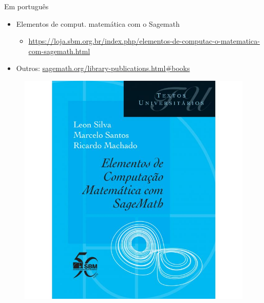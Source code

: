 \documentclass[12pt]{beamer}
\begin{document}
\begin{frame}
  {Em português}
\begin{minipage}{.5\textwidth}
  \begin{itemize}
    \item Elementos de comput. matemática com o Sagemath
    \begin{itemize}
      \item \url{https://loja.sbm.org.br/index.php/elementos-de-computac-o-matematica-com-sagemath.html}
    \end{itemize}
  \item Outros: \url{sagemath.org/library-publications.html\#books}
  \end{itemize}
\end{minipage}
\begin{minipage}{.4\textwidth}
    \begin{figure}[h]
    \centering
    \includegraphics[scale=0.3]{img/sbm.jpg}
  \end{figure}
\end{minipage}
\end{frame}
\end{document}
